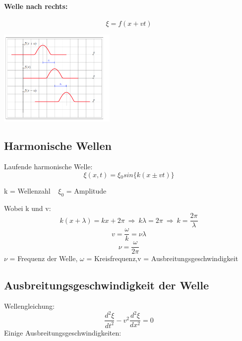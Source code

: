 \documentclass[7pt]{article}
\begin{document}
\begin{multicols*}{3}
\paragraph{Welle nach rechts:}
\begin{equation*}
\xi = f(x+vt) 
\end{equation*}
\begin{center}
	\includegraphics[width=160pt]{images/wellenrichtung.png}
\end{center}

\columnbreak


\subsection{Harmonische Wellen}
Laufende harmonische Welle:
\begin{equation*}
\xi(x,t) = \xi {_0} sin\lbrace k(x\pm vt) \rbrace
\end{equation*}

k = Wellenzahl $\> \>$ 
$\xi_0$ = Amplitude\newline
\newline

Wobei k und v:
\begin{equation*}
k(x+\lambda) = kx + 2\pi \> \Longrightarrow  \> k\lambda = 2\pi \> \Longrightarrow \> k = \frac{2\pi}{\lambda}
\end{equation*}
\begin{equation*}
v = \frac{\omega}{k} = \nu\lambda
\end{equation*}
\begin{equation*}
\nu = \frac{\omega}{2\pi}
\end{equation*}
$\nu$ = Frequenz der Welle, $\omega$ = Kreisfrequenz,\newline v = Ausbreitungsgeschwindigkeit



\subsection{Ausbreitungsgeschwindigkeit der Welle}
Wellengleichung:
\begin{equation*}
\frac{d^2\xi}{dt^2} - v^2\frac{d^2\xi}{dx^2} = 0 
\end{equation*}
\newline
Einige Ausbreitungsgeschwindigkeiten:


\end{multicols*}
\end{document}

